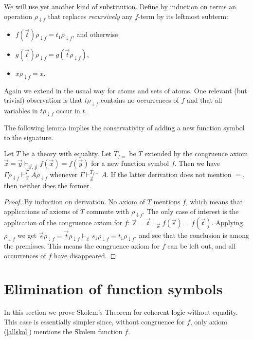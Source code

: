 \documentclass[10pt,a4paper]{article}
\newcommand{\ldf}[1]{#1\rho_{{\downarrow}f}}
\begin{document}
We will use yet another kind of substitution. Define by induction on terms an operation
$\ldf{}$ that replaces \emph{recursively} any $f$-term by its leftmost subterm:
\begin{itemize}
\item $\ldf{f(\vec{t})} = \ldf{t_1}$, and otherwise
\item $\ldf{g(\vec{t})} = g(\ldf{\vec{t}})$,
\item $\ldf{x} = x$.
\end{itemize}
Again we extend in the usual way for atoms and sets of atoms.
One relevant (but trivial) observation is that $\ldf{t}$ contains no occurrences of $f$
and that all variables in $\ldf{t}$ occur in $t$.

The following lemma implies the conservativity of adding a new
function symbol to the signature.

\begin{lemma}\label{subst3}
Let $T$ be a theory with equality.
Let $T_{f{=}}$ be $T$ extended by the congruence axiom 
$\vec{x}=\vec{y} \vdash_{\vec{x},\vec{y}} f(\vec{x}) = f(\vec{y})$
for a new function symbol $f$. 
Then we have $\ldf{\Gamma}\vdash_{\vec{x}}^T \ldf{A}$
whenever $\Gamma\vdash_{\vec{x}}^{T_{f{=}}} A$.
If the latter derivation does not mention $=$, then neither does the former.
\end{lemma}

\begin{proof}
By induction on derivation. No axiom of $T$ mentions $f$, which means
that applications of axioms of $T$ commute with $\ldf{}$. The only case of
interest is the application of the  congruence axiom for $f$:
$\vec{s}=\vec{t} \vdash_{\vec{x}} f(\vec{s}) = f(\vec{t})$. Applying $\ldf{}$ we get 
$\vec{s}\ldf{}=\vec{t}\ldf{} \vdash_{\vec{x}} s_1\ldf{} = t_1\ldf{}$,
and see that the conclusion is among the premisses. This means the congruence
axiom for $f$ can be left out, and all occurrences of $f$ have disappeared.
\end{proof}



\section{Elimination of function symbols}\label{sec:skolemfunction}

In this section we prove Skolem's Theorem for coherent logic without equality.
This case is essentially simpler since, without congruence for $f$, 
only axiom (\ref{allskol}) mentions the Skolem function $f$. 
\end{document}
